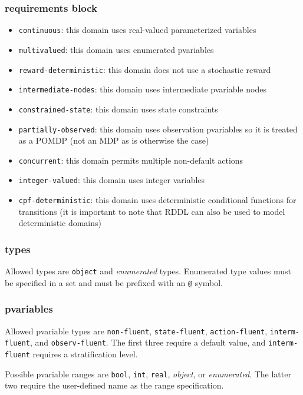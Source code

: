 \documentclass[11pt,a4paper]{article}
\begin{document}
\subsubsection{requirements block}

\label{sec:req}

\begin{itemize}
\item \texttt{continuous}: this domain uses real-valued parameterized variables
\item \texttt{multivalued}: this domain uses enumerated pvariables 
\item \texttt{reward-deterministic}: this domain does not use a stochastic reward
\item \texttt{intermediate-nodes}: this domain uses intermediate pvariable nodes
\item \texttt{constrained-state}: this domain uses state constraints
\item \texttt{partially-observed}: this domain uses observation pvariables so it is treated as a POMDP (not an MDP as is otherwise the case)
\item \texttt{concurrent}: this domain permits multiple non-default actions
\item \texttt{integer-valued}: this domain uses integer variables
\item \texttt{cpf-deterministic}: this domain uses deterministic conditional functions for transitions (it is important to note that RDDL can also be used to model deterministic domains)
\end{itemize}

\subsubsection{types}

Allowed types are \texttt{object} and \emph{enumerated} types.
Enumerated type values must be specified in a set and 
must be prefixed with an \texttt{@} symbol.

\subsubsection{pvariables}

Allowed pvariable types are \texttt{non-fluent},
\texttt{state-fluent}, \texttt{action-fluent}, \texttt{interm-fluent},
and \texttt{observ-fluent}.  The first three require a default value,
and \texttt{interm-fluent} requires a stratification level.

Possible pvariable ranges are
\texttt{bool}, \texttt{int}, \texttt{real}, \emph{object}, or
\emph{enumerated}.  The latter two require the user-defined
name as the range specification.
\end{document}
